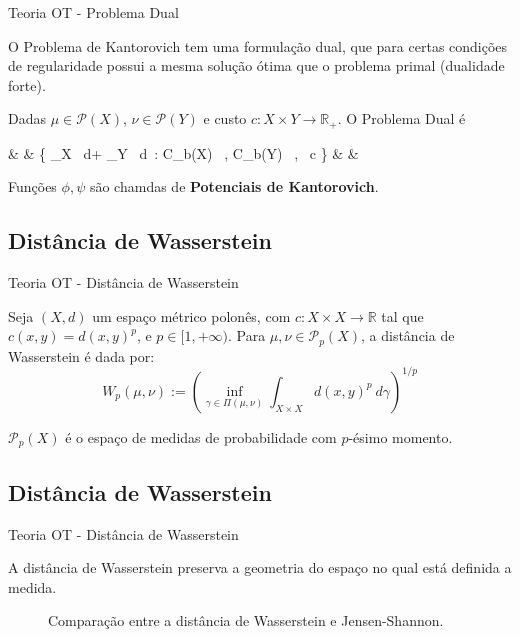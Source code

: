 \documentclass[10pt]{beamer}
\begin{document}
\begin{frame}[fragile]{Teoria OT - Problema Dual}

	O Problema de Kantorovich tem uma formulação dual, que
	para certas condições de regularidade possui a mesma
	solução ótima que o problema primal (dualidade forte).

	\begin{definition}
		Dadas $\mu \in \mathcal P(X)$, $\nu \in \mathcal P (Y)$ e
		custo $c:X \times Y \to \mathbb R_+$. O
		Problema Dual é
		\begin{flalign}
			 &  &
			\sup \left \{
			\int_X \phi \ d\mu + \int_Y \psi \ d\nu \ :
			\phi \in C_b(X) \ , \psi \in C_b(Y) \ ,
			\ \phi \oplus \psi \leq c
			\right \}
			              &  &
			\label{eqt:dualproblem}
		\end{flalign}
	\end{definition}

	Funções $\phi, \psi$ são chamdas de \textbf{Potenciais de Kantorovich}.

\end{frame}

\subsection{Distância de Wasserstein}
\begin{frame}[fragile]{Teoria OT - Distância de Wasserstein}

	\begin{definition}

		Seja $(X,d)$ um espaço métrico polonês, com $c:X \times X \to \mathbb R$ tal que $c(x,y)=d(x,y)^p$, e
		$p \in [1,+\infty)$.
		Para $\mu,\nu \in \mathcal P_p(X)$, a distância de Wasserstein é dada por:
		\begin{equation}
			W_p(\mu,\nu) :=
			\left(
			\inf_{\gamma \in \Pi(\mu,\nu)}
			\int_{X \times X} d(x,y)^p \ d\gamma
			\right)^{1/p}
			\label{def:Wasserstein}
		\end{equation}
	\end{definition}

	$\mathcal P_p(X)$ é o espaço de medidas de probabilidade com $p$-ésimo momento.

\end{frame}

\subsection{Distância de Wasserstein}
\begin{frame}[fragile]{Teoria OT - Distância de Wasserstein}

	A distância de Wasserstein preserva a geometria do espaço
	no qual está definida a medida.

	\begin{figure}[H]
		\centering
		\def\svgscale{0.45}
		
		\caption{Comparação entre a distância de Wasserstein e Jensen-Shannon.}
		\label{fig:pub}
	\end{figure}

\end{frame}
\end{document}
